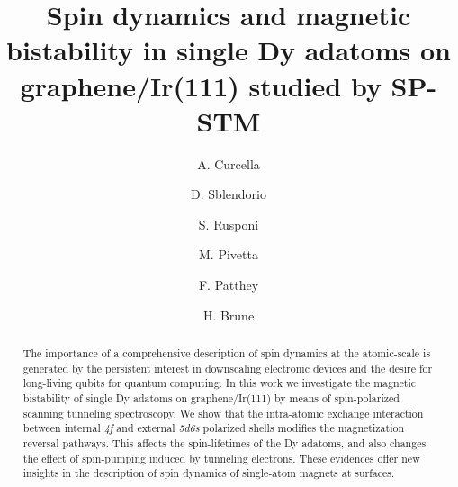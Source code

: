 \documentclass[
reprint,amsmath,amssymb,aps]{revtex4-2}
\begin{document}

\title{Spin dynamics and magnetic bistability in single Dy adatoms on graphene/Ir(111)
studied by SP-STM}

\author{A. Curcella}

\author{D. Sblendorio}

\author{S. Rusponi}

\author{M. Pivetta}

\author{F. Patthey}

\author{H. Brune}
 

\begin{abstract}

The importance of a comprehensive description of spin dynamics at the atomic-scale is generated by the persistent interest in downscaling electronic devices and the desire for long-living qubits for quantum computing. In this work we investigate the magnetic bistability of single Dy adatoms on graphene/Ir(111) by means of spin-polarized scanning tunneling spectroscopy. We show that the intra-atomic exchange interaction between internal \textit{4f} and external \textit{5d6s} polarized shells modifies the magnetization reversal pathways. This affects the spin-lifetimes of the Dy adatoms, and also changes the effect of spin-pumping induced by tunneling electrons. These evidences offer new insights in the description of spin dynamics of single-atom magnets at surfaces. 


\end{abstract}
\end{document}
